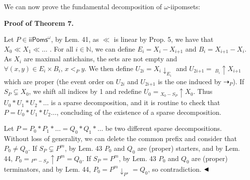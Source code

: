 \documentclass[10pt,a4paper]{article}
\begin{document}
 
 
We can now prove the fundamental decomposition of $\omega$-iipomsets:\par
 
 
 
 
\par\medskip\noindent\textbf{Proof of Theorem 7.}\par
 
 
Let $P\in{\mathsf{iiPoms}^{\omega}}$, by Lem. 41, as $\ll$ is linear by Prop. 5, we have that $X_{0}\ll X_{1}\ll\dots$ . For all $i\in\mathbb{N}$, we can define $E_{i}=X_{i}-X_{i\text{+}1}$ and $B_{i}=X_{i\text{+}1}-X_{i}$. As $X_{i}$ are maximal antichains, the sets are not empty and $\forall(x,y)\in E_{i}\times B_{i},\,x<_{P}y$. We then define $U_{2i}={X_{i}}{\downarrow}_{E_{i}}$ and $U_{2i\text{+}1}=\ {}_{B_{i}\!}{\uparrow}{X_{i\text{+}1}}$ which are proper (the event order on $U_{2i}$ and $U_{2i\text{+}1}$ is the one induced by $\dashrightarrow_{P}$). If $S_{P}\subsetneq X_{0}$, we shift all indices by 1 and redefine $U_{0}={}_{X_{0}-S_{P}\!}{\uparrow}{X_{0}}$. Thus $U_{0}*U_{1}*U_{2}*\dots$ is a sparse decomposition, and it is routine to check that $P=U_{0}*U_{1}*U_{2}\dots$, concluding of the existence of a sparse decomposition.\par
 
 
 
Let $P=P_{0}*P_{1}*\dots=Q_{0}*Q_{1}*\dots$ be two different sparse decompositions. Without loss of generality, we can delete the common prefix and consider that $P_{0}\neq Q_{0}$. If $S_{P}\subsetneq P^{m}$, by Lem. 43 $P_{0}$ and $Q_{0}$ are (proper) starters, and by Lem. 44, $P_{0}={}_{P^{m}-S_{P}\!}{\uparrow}{P^{m}}=Q_{0}$. If $S_{P}=P^{m}$, by Lem. 43 $P_{0}$ and $Q_{0}$ are (proper) terminators, and by Lem. 44, $P_{0}={P^{m}}{\downarrow}_{P^{s}}=Q_{0}$, so contradiction. $\hfill\blacktriangleleft$\par
 
 
 
 
\end{document}
